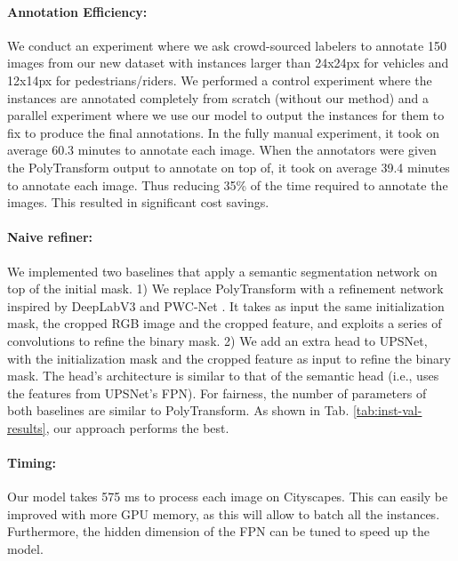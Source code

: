 \documentclass[10pt,twocolumn,letterpaper]{article}
\begin{document}
\vspace{-2mm}

\paragraph{Annotation Efficiency:}
We conduct an experiment where we ask crowd-sourced labelers to annotate 150 images from our new dataset with instances larger than 24x24px for vehicles and 12x14px for pedestrians/riders. We performed a control experiment where the instances are annotated completely from scratch (without our method) and a parallel experiment where we use our model to output the instances for them to fix to produce the final annotations. In the fully manual experiment, it took on average 60.3 minutes to annotate each image. When the annotators were given the PolyTransform output to annotate on top of, it took on average 39.4 minutes to annotate each image. Thus reducing  35\% of the time required to annotate the images. This resulted in significant cost savings. 

\vspace{-2mm}

\paragraph{Naive refiner:} We implemented two  baselines that apply a semantic segmentation network on top of the initial mask. 
1) We replace PolyTransform with a refinement network inspired by DeepLabV3 \cite{deeplabv3} and PWC-Net \cite{Sun2018PWC-Net} . 
It takes as input the same initialization mask, the cropped RGB image and the cropped feature, and exploits a series of convolutions to refine the binary mask. 
2) We add an extra head to  UPSNet, with the initialization mask and the cropped feature as input to refine the binary mask. The head's architecture  is similar to that of the semantic head (i.e., uses the features from  UPSNet's FPN).
For fairness, the number of parameters of both baselines are similar to PolyTransform. 
As shown in Tab. \ref{tab:inst-val-results}, our approach  performs the best.

\paragraph{Timing:}
Our model takes 575 ms to process each image on Cityscapes. This can easily be improved with more GPU memory, as this will allow to batch all the instances. Furthermore, the hidden dimension of the FPN can be tuned to speed up the model.
\end{document}
